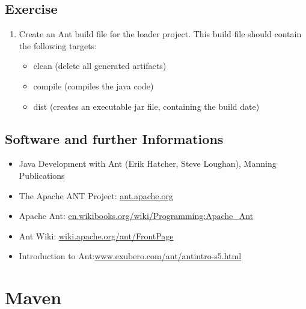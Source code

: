 \subsection{Exercise}
\begin{enumerate}
\item Create an Ant build file for the loader project. This build file
should contain the following targets:
\begin{itemize}
\item clean (delete all generated artifacts)
\item compile (compiles the java code)
\item dist (creates an executable jar file, containing the build date)
\end{itemize}

\end{enumerate}
%
\newslide
\subsection{Software and further Informations}
\begin{itemize}
\item Java Development with Ant (Erik Hatcher, Steve Loughan), Manning
  Publications
\item The Apache ANT Project:
  \href{http://ant.apache.org}{ant.apache.org}
\item Apache Ant:
  \href{http://en.wikibooks.org/wiki/Programming:Apache_Ant}
     {en.wikibooks.org/wiki/Programming:Apache\_Ant}
\item Ant Wiki:
  \href{http://wiki.apache.org/ant/FrontPage}{wiki.apache.org/ant/FrontPage}
\item Introduction to
  Ant:\href{http://www.exubero.com/ant/antintro-s5.html}
{www.exubero.com/ant/antintro-s5.html}
\end{itemize}
%
\newslide
%
%

\newpage

\section{Maven}

